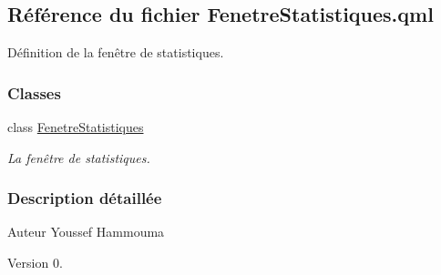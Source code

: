 \hypertarget{_fenetre_statistiques_8qml}{}\subsection{Référence du fichier Fenetre\+Statistiques.\+qml}
\label{_fenetre_statistiques_8qml}


Définition de la fenêtre de statistiques.  


\subsubsection*{Classes}
\begin{DoxyCompactItemize}
\item 
class \hyperlink{class_fenetre_statistiques}{Fenetre\+Statistiques}
\begin{DoxyCompactList}\small\item\em La fenêtre de statistiques. \end{DoxyCompactList}\end{DoxyCompactItemize}


\subsubsection{Description détaillée}
\begin{DoxyAuthor}{Auteur}
Youssef Hammouma
\end{DoxyAuthor}
\begin{DoxyVersion}{Version}
0. 
\end{DoxyVersion}
